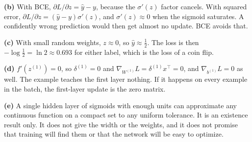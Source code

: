 \textbf{(b)} With BCE, $\partial L/\partial z = \hat y - y$, because the $\sigma'(z)$ factor cancels. With squared error, $\partial L/\partial z = (\hat y - y)\sigma'(z)$, and $\sigma'(z) \approx 0$ when the sigmoid saturates. A confidently wrong prediction would then get almost no update. BCE avoids that.

\textbf{(c)} With small random weights, $z \approx 0$, so $\hat y \approx \tfrac12$. The loss is then $-\log\tfrac12 = \ln 2 \approx 0.693$ for either label, which is the loss of a coin flip.

\textbf{(d)} $f'(z^{(1)}) = 0$, so $\delta^{(1)} = 0$ and $\nabla_{W^{(1)}}L = \delta^{(1)}x^\top = 0$, and $\nabla_{b^{(1)}}L = 0$ as well. The example teaches the first layer nothing. If it happens on every example in the batch, the first-layer update is the zero matrix.

\textbf{(e)} A single hidden layer of sigmoids with enough units can approximate any continuous function on a compact set to any uniform tolerance. It is an existence result only. It does not give the width or the weights, and it does not promise that training will find them or that the network will be easy to optimize.
